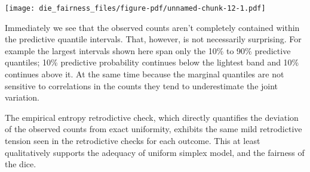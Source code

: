 \documentclass[
  letterpaper,
  DIV=11,
  numbers=noendperiod]{scrartcl}
\newenvironment{Shaded}{\begin{snugshade}}{\end{snugshade}}
\newcommand{\AttributeTok}[1]{\textcolor[rgb]{0.40,0.45,0.13}{#1}}
\newcommand{\ControlFlowTok}[1]{\textcolor[rgb]{0.00,0.23,0.31}{#1}}
\newcommand{\DecValTok}[1]{\textcolor[rgb]{0.68,0.00,0.00}{#1}}
\newcommand{\FunctionTok}[1]{\textcolor[rgb]{0.28,0.35,0.67}{#1}}
\newcommand{\NormalTok}[1]{\textcolor[rgb]{0.00,0.23,0.31}{#1}}
\newcommand{\OtherTok}[1]{\textcolor[rgb]{0.00,0.23,0.31}{#1}}
\newcommand{\SpecialCharTok}[1]{\textcolor[rgb]{0.37,0.37,0.37}{#1}}
\newcommand{\StringTok}[1]{\textcolor[rgb]{0.13,0.47,0.30}{#1}}
\begin{document}
\begin{Shaded}
\end{Shaded}

\texttt{[image: die\_fairness\_files/figure-pdf/unnamed-chunk-12-1.pdf]}

Immediately we see that the observed counts aren't completely contained
within the predictive quantile intervals. That, however, is not
necessarily surprising. For example the largest intervals shown here
span only the 10\% to 90\% predictive quantiles; 10\% predictive
probability continues below the lightest band and 10\% continues above
it. At the same time because the marginal quantiles are not sensitive to
correlations in the counts they tend to underestimate the joint
variation.

The empirical entropy retrodictive check, which directly quantifies the
deviation of the observed counts from exact uniformity, exhibits the
same mild retrodictive tension seen in the retrodictive checks for each
outcome. This at least qualitatively supports the adequacy of uniform
simplex model, and the fairness of the dice.
\end{document}
